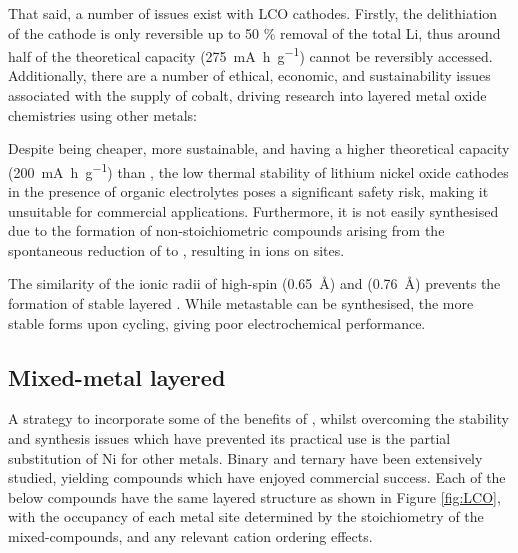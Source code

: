 That said, a number of issues exist with LCO cathodes.
Firstly, the delithiation of the cathode is only reversible up to 50 \% removal of the total Li, thus around half of the theoretical capacity (\SI{275}{\milli\ampere\hour\per\gram}) cannot be reversibly accessed.\cite{Rozier2015}
Additionally, there are a number of ethical, economic, and sustainability issues associated with the supply of cobalt,\cite{Mauger2017, Larcher2015} driving research into layered metal oxide chemistries using other metals:\cite{Rozier2015}

\begin{labeling}{\textbf{}}
	\item [\textbf{\ce{LiNiO2}}] Despite being cheaper, more sustainable, and having a higher theoretical capacity (\SI{200}{\milli\ampere\hour\per\gram}) than , the low thermal stability of lithium nickel oxide cathodes in the presence of organic electrolytes poses a significant safety risk, making it unsuitable for commercial applications.
	Furthermore, it is not easily synthesised due to the formation of non-stoichiometric compounds arising from the spontaneous reduction of  to  , resulting in  ions on  sites.\cite{Das2017}
	\item [\textbf{\ce{LiMnO2}}] The similarity of the ionic radii of high-spin  (\SI{0.65}{\angstrom}) and  (\SI{0.76}{\angstrom}) prevents the formation of stable layered .\cite{Rozier2015,Rossen1992}
	While metastable  can be synthesised, the more stable  forms upon cycling, giving poor electrochemical performance.
\end{labeling}

\newpage
\subsection{Mixed-metal layered }
A strategy to incorporate some of the benefits of , whilst overcoming the stability and synthesis issues which have prevented its practical use is the partial substitution of Ni for other metals.\cite{Rozier2015}
Binary and ternary  have been extensively studied, yielding compounds which have enjoyed commercial success.
Each of the below compounds have the same layered structure as  shown in Figure \ref{fig:LCO}, with the occupancy of each metal site determined by the stoichiometry of the mixed-compounds, and any relevant cation ordering effects.

